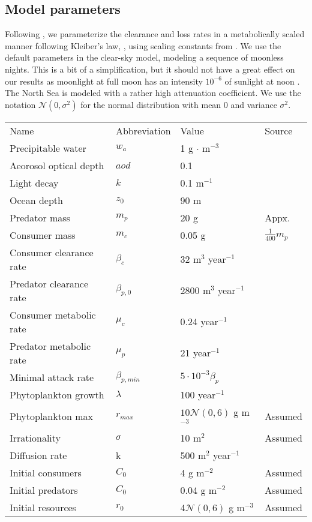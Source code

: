 \subsection{Model parameters}
Following \citep{yodzis1992body}, we parameterize the clearance and loss rates in a metabolically scaled manner following Kleiber's law, \citep{yodzis1992body}, using scaling constants from \citep[Table 3]{kha_2019}. We use the default parameters in the clear-sky model, modeling a sequence of moonless nights. This is a bit of a simplification, but it should not have a great effect on our results as moonlight at full moon has an intensity $10^{-6}$ of sunlight at noon \citep{biberman1971natural}. The North Sea is modeled with a rather high attenuation coefficient. We use the notation $\mathcal{N}(0,\sigma^2)$ for the normal distribution with mean $0$ and variance $\sigma^2$.


\begin{tabular}{l  l  l  l}
  Name & Abbreviation & Value & Source \\
  Precipitable water & $w_a$ & 1 g $\cdot$ m$^{-3}$ & \citep{gueymard1995smarts2}\\
  Aeorosol optical depth & $aod$ & 0.1 & \citep{gueymard1995smarts2}\\
  Light decay & $k$ & 0.1 m$^{-1}$ & \citep{gueymard1995smarts2} \\
  Ocean depth & $z_0$ & 90 m &  \citep{mcglade200212} \\
  Predator mass & $m_p$ & 20 g & Appx. \citep{wheeler1975collins} \\
  Consumer mass & $m_c$ & 0.05 g & $\frac{1}{400} m_p$ \citep[Table 3]{kha_2019} \\
  Consumer clearance rate & $\beta_c$ & 32 m$^{3}$ year$^{-1}$ & \citep[Table 3]{kha_2019}\\
  Predator clearance rate & $\beta_{p,0}$ & 2800 m$^3$ year$^{-1}$ & \citep[Table 3]{kha_2019}\\
  Consumer metabolic rate & $\mu_c$ & 0.24 year$^{-1}$ & \citep[Table 3]{kha_2019}\\
  Predator metabolic rate & $\mu_p$ & 21 year$^{-1}$ & \citep[Table 3]{kha_2019}\\
  Minimal attack rate & $\beta_{p,min}$ & $5 \cdot 10^{-3} \beta_p$ & \citep{verticalmigration} \\
  Phytoplankton growth & $\lambda$ & 100 year$^{-1}$ & \citep{arin2002phytoplankton}\\
  Phytoplankton max & $r_{max}$ & $10\mathcal{N}(0,6)$ g m $^{-3}$ & Assumed\\
  Irrationality & $\sigma$ & 10 m$^2$ & Assumed\\
  Diffusion rate & k & 500 m$^{2}$ year$^{-1}$ & \citep[Marine Habitats]{schaechter2009encyclopedia}\\
  Initial consumers & $C_0$ & 4  g m$^{-2}$ & Assumed \\
  Initial predators & $C_0$ & 0.04  g m$^{-2}$ & Assumed \\
  Initial resources & $r_0$ & 4$\mathcal{N}(0,6)$ g m$^{-3}$ & Assumed
\end{tabular}

